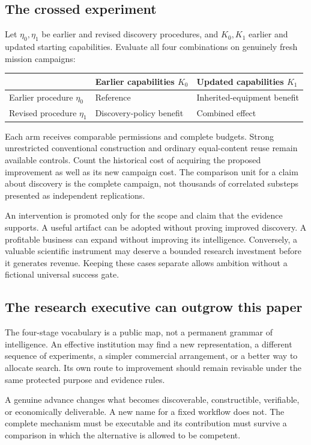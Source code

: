 \subsection{The crossed experiment}
Let $\eta_0,\eta_1$ be earlier and revised discovery procedures, and $K_0,K_1$ earlier and updated starting capabilities. Evaluate all four combinations on genuinely fresh mission campaigns:
\begin{center}
\begin{tabular}{@{}lll@{}}
\toprule
 & Earlier capabilities $K_0$ & Updated capabilities $K_1$\\
\midrule
Earlier procedure $\eta_0$ & Reference & Inherited-equipment benefit\\
Revised procedure $\eta_1$ & Discovery-policy benefit & Combined effect\\
\bottomrule
\end{tabular}
\end{center}

Each arm receives comparable permissions and complete budgets. Strong unrestricted conventional construction and ordinary equal-content reuse remain available controls. Count the historical cost of acquiring the proposed improvement as well as its new campaign cost. The comparison unit for a claim about discovery is the complete campaign, not thousands of correlated substeps presented as independent replications.

An intervention is promoted only for the scope and claim that the evidence supports. A useful artifact can be adopted without proving improved discovery. A profitable business can expand without improving its intelligence. Conversely, a valuable scientific instrument may deserve a bounded research investment before it generates revenue. Keeping these cases separate allows ambition without a fictional universal success gate.

\subsection{The research executive can outgrow this paper}
The four-stage vocabulary is a public map, not a permanent grammar of intelligence. An effective institution may find a new representation, a different sequence of experiments, a simpler commercial arrangement, or a better way to allocate search. Its own route to improvement should remain revisable under the same protected purpose and evidence rules.

A genuine advance changes what becomes discoverable, constructible, verifiable, or economically deliverable. A new name for a fixed workflow does not. The complete mechanism must be executable and its contribution must survive a comparison in which the alternative is allowed to be competent.

